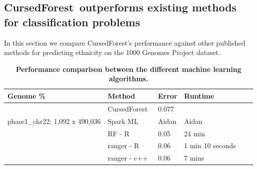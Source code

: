 \documentclass[10pt,letterpaper]{article}
\newcommand{\cursedforest}{{\sc CursedForest}}
\begin{document}
\subsection{\cursedforest\ outperforms existing methods for classification problems}
In this section we compare \cursedforest 's performance against other published methods for predicting ethnicity on the
1000 Genomes Project dataset.

\begin{table}[!ht]
\begin{minipage}{\textwidth}
\centering
\caption{
{\bf Performance comparison between the different machine learning algorithms.}}
\begin{tabular}{|l|l|l|l|l|l||}
\hline
\bf{Genome \%}                      & \bf{Method} & \bf{Error}  & \bf{Runtime}  \\
\hline

\multirow{3}{*}{phase1\_chr22: 1,092 x 490,036} & \cursedforest\ & 0.077  &                         \\
                                                & Spark ML  &  Aidan           &           Aidan         \\
                                                & RF - R         & 0.05       & 24 min           \\
                                                & ranger - R      & 0.06       & 1 min 10 seconds       \\
                                                & ranger - c++     & 0.06       & 7 mins            \\


\end{tabular}
\end{minipage}
\end{table}
\end{document}
